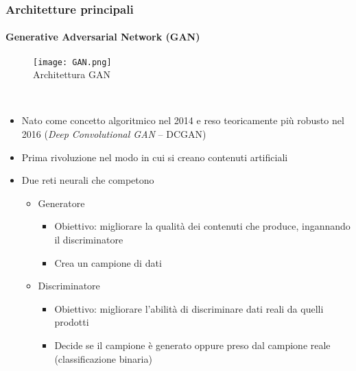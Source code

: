 \begin{frame}[t] \frametitle{Architetture principali}
\framesubtitle{Generative Adversarial Network (GAN)}
{\scriptsize
{}
	\begin{minipage}[t]{\textwidth}
		\begin{figure}
			\centering
			\texttt{[image: GAN.png]}
			\\Architettura GAN
		\end{figure}
	\end{minipage}
	\\\vspace*{.3cm}
	\begin{minipage}[t]{\textwidth}
		\begin{itemize}[leftmargin=10pt,align=right]
			\item[\alert{\faArrowCircleRight}] Nato come concetto algoritmico nel 2014 e reso teoricamente più robusto nel 2016 (\emph{\alert{D}eep \alert{C}onvolutional \alert{GAN}} -- \alert{DCGAN})
			\onslide<2->\item[\alert{\faArrowCircleRight}] Prima rivoluzione nel modo in cui si creano contenuti artificiali
			\onslide<3->\item[\alert{\faArrowCircleRight}] Due reti neurali che competono
			\begin{itemize}[leftmargin=10pt,align=right]
				\onslide<4->\item[\alert{\faArrowCircleRight}] \alert{Generatore}
				\begin{itemize}[leftmargin=10pt,align=right]
					\item[\alert{\faArrowCircleRight}] \alert{Obiettivo:} migliorare la qualità dei contenuti che produce, ingannando il discriminatore
					\item[\alert{\faArrowCircleRight}] Crea un campione di dati
				\end{itemize}
				\item[\alert{\faArrowCircleRight}] \alert{Discriminatore}
				\begin{itemize}[leftmargin=10pt,align=right]
					\item[\alert{\faArrowCircleRight}] \alert{Obiettivo:} migliorare l'abilità di discriminare dati reali da quelli prodotti
					\item[\alert{\faArrowCircleRight}] Decide se il campione è generato oppure preso dal campione reale (classificazione binaria)
				\end{itemize}
			\end{itemize}
		\end{itemize}
	\end{minipage}
}
\end{frame}
